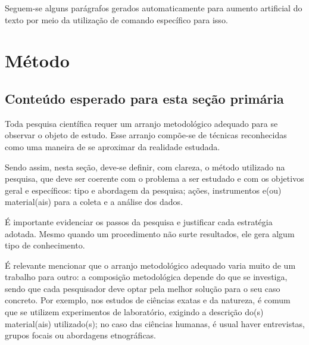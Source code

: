 Seguem-se alguns parágrafos gerados automaticamente para aumento artificial do texto por meio da utilização de comando específico para isso.

\lipsum[20-22]


\chapter{Método}\label{sec-met} %
\section{Conteúdo esperado para esta seção primária}

Toda pesquisa científica requer um arranjo metodológico adequado para se observar o objeto de estudo. Esse arranjo compõe-se de técnicas reconhecidas como uma maneira de se aproximar da realidade estudada.

Sendo assim, nesta seção, deve-se definir, com clareza, o método utilizado na pesquisa, que deve ser coerente com o problema a ser estudado e com os objetivos geral e específicos: tipo e abordagem da pesquisa; ações, instrumentos e(ou) material(ais) para a coleta e a análise dos dados.

É importante evidenciar os passos da pesquisa e justificar cada estratégia adotada. Mesmo quando um procedimento não surte resultados, ele gera algum tipo de conhecimento.

É relevante mencionar que o arranjo metodológico adequado varia muito de um trabalho para outro: a composição metodológica depende do que se investiga, sendo que cada pesquisador deve optar pela melhor solução para o seu caso concreto. Por exemplo, nos estudos de ciências exatas e da natureza, é comum que se utilizem experimentos de laboratório, exigindo a descrição do(s) material(ais) utilizado(s); no caso das ciências humanas, é usual haver entrevistas, grupos focais ou abordagens etnográficas.

